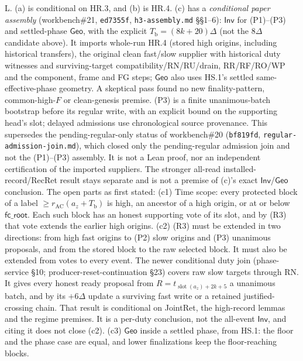 \documentclass{article}
\newcommand{\slot}{\operatorname{slot}}
\newcommand{\fcroot}{\mathsf{fc\_root}}
\begin{document}
{L.  (a) is conditional on HR.3, and (b) is HR.4.  (c) has a
\emph{conditional paper assembly} (workbench\#21, \texttt{ed7355f},
\texttt{h3-assembly.md} \S\S1--6): $\mathsf{Inv}$ for (P1)--(P3) and
settled-phase $\mathsf{Geo}$, with the explicit $T_{\mathrm b}=(8k+20)\Delta$
(not the $8\Delta$ candidate above).  It imports whole-run HR.4 (stored high
origins, including historical transfers), the original clean fast/slow
supplier with historical duty witnesses and surviving-target
compatibility/RN/RU/drain, RR/RF/RO/WP and the component, frame and FG steps;
$\mathsf{Geo}$ also uses HS.1's settled same-effective-phase geometry.  A
skeptical pass found no new finality-pattern, common-high-$F$ or
clean-genesis premise.  (P3) is a finite unanimous-batch bootstrap before its
regular write, with an explicit bound on the supporting head's slot; delayed
admissions use chronological source provenance.  This supersedes the
pending-regular-only status of workbench\#20 (\texttt{bf819fd},
\texttt{regular-admission-join.md}), which closed only the pending-regular
admission join and not the (P1)--(P3) assembly.  It is not a Lean proof, nor
an independent certification of the imported suppliers.  The stronger
all-read installed-record/RecRet result stays separate and is not a premise of
(c)'s exact $\mathsf{Inv}$/$\mathsf{Geo}$ conclusion.  The open parts as first
stated:
(c1) Time scope: every protected block of a label
$\geq r_{\mathrm{AC}}(a_z+T_{\mathrm b})$ is high, an ancestor of a high
origin, or at or below $\fcroot$.  Each such block has an honest supporting
vote of its slot, and by (R3) that vote extends the earlier high origins.
(c2) (R3) must be extended in two directions: from high fast origins to (P2)
slow origins and (P3) unanimous proposals, and from the stored block to the
raw selected block.  It must also be extended from votes to every event.
The newer conditional duty join (phase-service \S10;
producer-reset-continuation \S23) covers raw slow targets through RN.  It
gives every honest ready proposal from $R=t_{\slot(a_z)+2k+5}$ a unanimous
batch, and by its $+6\Delta$ update a surviving fast write or a retained
justified-crossing chain.  That result is conditional on JointRet, the
high-record lemmas and the regime premises.  It is a per-duty conclusion,
not the all-event $\mathsf{Inv}$, and citing it does not close (c2).
(c3) $\mathsf{Geo}$ inside a settled phase, from HS.1: the floor and the
phase case are equal, and lower finalizations keep the floor-reaching
blocks.}
\end{document}
